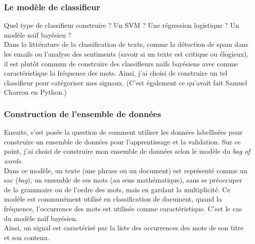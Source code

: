             \subsubsection{Le modèle de classifieur}
                Quel type de classifieur construire ? Un SVM ? Une régression logistique ? Un modèle naïf bayésien ?\\
                Dans la littérature de la classification de texte, comme la détection de spam dans les emails ou l'analyse des sentiments (savoir si un texte est critique ou élogieux), il est plutôt commun de construire des classifieurs naïfs bayésiens avec comme caractéristique la fréquence des mots. Ainsi, j'ai choisi de construire un tel classifieur pour catégoriser mes signaux. (C'est également ce qu'avait fait Samuel Charron en Python.)

            \subsubsection{Construction de l'ensemble de données}
                Ensuite, s'est posée la question de comment utiliser les données labellisées pour construire un ensemble de données pour l'apprentissage et la validation. Sur ce point, j'ai choisi de construire mon ensemble de données selon le modèle du \textit{bag of words}.\\

                Dans ce modèle, un texte (une phrase ou un document) est représenté comme un sac (\textit{bag}), un ensemble de ses mots (au sens mathématique), sans se préoccuper de la grammaire ou de l'ordre des mots, mais en gardant la multiplicité. Ce modèle est communément utilisé en classification de document, quand la fréquence, l’occurrence des mots est utilisée comme caractéristique. C'est le cas du modèle naïf bayésien.\\

                Ainsi, un signal est caractérisé par la liste des occurrences des mots de son titre et son contenu.

